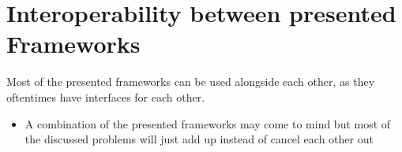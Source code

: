 
\section{Interoperability between presented Frameworks}

Most of the presented frameworks can be used alongside each other, as they oftentimes have interfaces for each other.

\begin{itemize}
	\item A combination of the presented frameworks may come to mind but most of the discussed problems will just add up instead of cancel each other out
\end{itemize}


